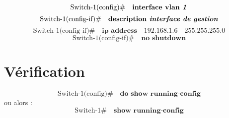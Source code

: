 \documentclass[a4paper,11pt]{article}
\begin{document}
	
	
\section{}
\begin{equation}
	\text{Switch-1(config)} \# \quad \textbf{interface vlan \textit{1}}
\end{equation}
\begin{equation}
	\text{Switch-1(config-if)} \# \quad \textbf{description \textit{interface de gestion}}
\end{equation}	
\begin{equation}
	\text{Switch-1(config-if)} \# \quad \textbf{ip address} \quad 192.168.1.6 \quad 255.255.255.0
\end{equation}	
\begin{equation}
	\text{Switch-1(config-if)} \# \quad \textbf{no shutdown}
\end{equation}	
	\section{Vérification}
\begin{equation}
	\text{Switch-1(config)} \# \quad \textbf{do show running-config}
\end{equation}
ou alors : 
\begin{equation}
	\text{Switch-1} \# \quad \textbf{show running-config}
\end{equation}
	
	
	
	
	
\end{document}
